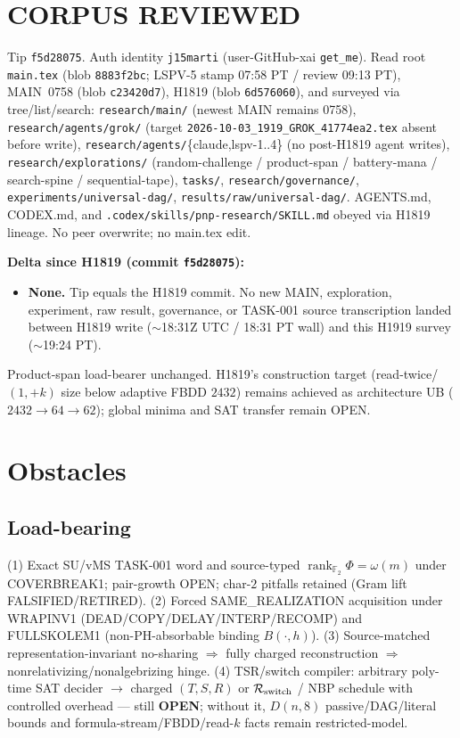 \documentclass[11pt]{article}
\begin{document}
\section*{CORPUS REVIEWED}
Tip \texttt{f5d28075}. Auth identity \texttt{j15marti}
(user-GitHub-xai \texttt{get\_me}).
Read root \texttt{main.tex} (blob \texttt{8883f2bc}; LSPV-5 stamp 07:58 PT / review 09:13 PT),
MAIN~0758 (blob \texttt{c23420d7}),
H1819 (blob \texttt{6d576060}),
and surveyed via tree/list/search:
\texttt{research/main/} (newest MAIN remains 0758),
\texttt{research/agents/grok/} (target \texttt{2026-10-03\_1919\_GROK\_41774ea2.tex} absent before write),
\texttt{research/agents/}\{claude,lspv-1..4\} (no post-H1819 agent writes),
\texttt{research/explorations/} (random-challenge / product-span / battery-mana / search-spine / sequential-tape),
\texttt{tasks/},
\texttt{research/governance/},
\texttt{experiments/universal-dag/},
\texttt{results/raw/universal-dag/}.
AGENTS.md, CODEX.md, and \texttt{.codex/skills/pnp-research/SKILL.md} obeyed via H1819 lineage.
No peer overwrite; no main.tex edit.

\textbf{Delta since H1819 (commit \texttt{f5d28075}):}
\begin{itemize}
\item \textbf{None.} Tip equals the H1819 commit. No new MAIN, exploration,
  experiment, raw result, governance, or TASK-001 source transcription landed
  between H1819 write ($\sim$18:31Z UTC / 18:31 PT wall) and this H1919 survey
  ($\sim$19:24 PT).
\end{itemize}
Product-span load-bearer unchanged. H1819's construction target (read-twice/$(1,+k)$
size below adaptive FBDD $2432$) remains achieved as architecture UB ($2432\to64\to62$);
global minima and SAT transfer remain OPEN.

\section*{Obstacles}
\subsection*{Load-bearing}
(1) Exact SU/vMS TASK-001 word and source-typed
$\operatorname{rank}_{\mathbb F_2}\Phi=\omega(m)$ under COVERBREAK1; pair-growth OPEN;
char-$2$ pitfalls retained (Gram lift FALSIFIED/RETIRED).
(2) Forced SAME\_REALIZATION acquisition under WRAPINV1
(DEAD/COPY/DELAY/INTERP/RECOMP) and FULLSKOLEM1 (non-PH-absorbable binding $B(\cdot,h)$).
(3) Source-matched representation-invariant no-sharing $\Rightarrow$ fully charged reconstruction
$\Rightarrow$ nonrelativizing/nonalgebrizing hinge.
(4) TSR/switch compiler: arbitrary poly-time SAT decider $\to$ charged $(T,S,R)$ or
$\mathcal R_{\rm switch}$ / NBP schedule with controlled overhead --- still \textbf{OPEN};
without it, $D(n,8)$ passive/DAG/literal bounds and formula-stream/FBDD/read-$k$ facts remain
restricted-model.
\end{document}
